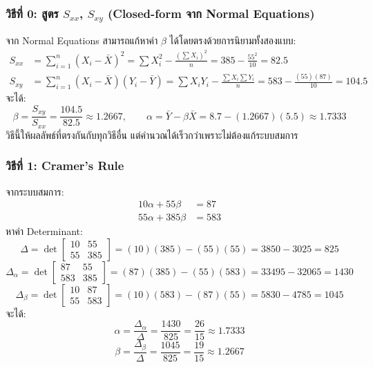 \documentclass[12pt,a4paper]{article}
\begin{document}
\subsubsection*{วิธีที่ 0: สูตร $S_{xx}$, $S_{xy}$ (Closed-form จาก Normal Equations)}
จาก Normal Equations สามารถแก้หาค่า $\beta$ ได้โดยตรงด้วยการนิยามทั้งสองแบบ:
\begin{align*}
    S_{xx} &= \sum_{i=1}^{n}(X_i - \bar{X})^2 = \sum X_i^2 - \frac{(\sum X_i)^2}{n} = 385 - \frac{55^2}{10} = 82.5 \\[4pt]
    S_{xy} &= \sum_{i=1}^{n}(X_i - \bar{X})(Y_i - \bar{Y}) = \sum X_iY_i - \frac{\sum X_i \sum Y_i}{n} = 583 - \frac{(55)(87)}{10} = 104.5
\end{align*}
จะได้:
\[
    \beta = \frac{S_{xy}}{S_{xx}} = \frac{104.5}{82.5} \approx 1.2667, \qquad \alpha = \bar{Y} - \beta\bar{X} = 8.7 - (1.2667)(5.5) \approx 1.7333
\]
วิธีนี้ให้ผลลัพธ์ที่ตรงกันกับทุกวิธีอื่น แต่คำนวณได้เร็วกว่าเพราะไม่ต้องแก้ระบบสมการ

\subsubsection*{วิธีที่ 1: Cramer's Rule}
จากระบบสมการ:
\begin{align*}
    10\alpha + 55\beta &= 87 \\
    55\alpha + 385\beta &= 583
\end{align*}
หาค่า Determinant:
\[
    \Delta = \det \begin{bmatrix} 10 & 55 \\ 55 & 385 \end{bmatrix} = (10)(385) - (55)(55) = 3850 - 3025 = 825
\]
\[
    \Delta_\alpha = \det \begin{bmatrix} 87 & 55 \\ 583 & 385 \end{bmatrix} = (87)(385) - (55)(583) = 33495 - 32065 = 1430
\]
\[
    \Delta_\beta = \det \begin{bmatrix} 10 & 87 \\ 55 & 583 \end{bmatrix} = (10)(583) - (87)(55) = 5830 - 4785 = 1045
\]
จะได้:
\[
    \alpha = \frac{\Delta_\alpha}{\Delta} = \frac{1430}{825} = \frac{26}{15} \approx 1.7333
\]
\[
    \beta = \frac{\Delta_\beta}{\Delta} = \frac{1045}{825} = \frac{19}{15} \approx 1.2667
\]
\end{document}
